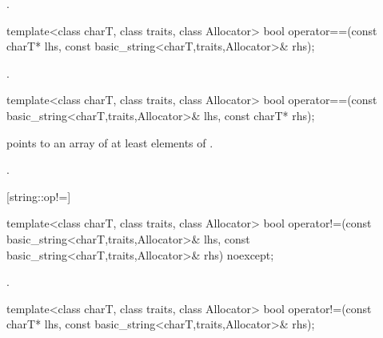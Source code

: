 \begin{itemdescr}
\pnum
\returns
{}.
\end{itemdescr}

%
%
\begin{itemdecl}
template<class charT, class traits, class Allocator>
  bool operator==(const charT* lhs,
                  const basic_string<charT,traits,Allocator>& rhs);
\end{itemdecl}

\begin{itemdescr}
\pnum
\returns
{}.
\end{itemdescr}

%
%
\begin{itemdecl}
template<class charT, class traits, class Allocator>
  bool operator==(const basic_string<charT,traits,Allocator>& lhs,
                  const charT* rhs);
\end{itemdecl}

\begin{itemdescr}
\pnum
\requires {} points to an array of at least 
elements of .

\pnum
\returns
{}.
\end{itemdescr}

%
[string::op!=]{}

%
%
\begin{itemdecl}
template<class charT, class traits, class Allocator>
  bool operator!=(const basic_string<charT,traits,Allocator>& lhs,
                  const basic_string<charT,traits,Allocator>& rhs) noexcept;
\end{itemdecl}

\begin{itemdescr}
\pnum
\returns
{}.
\end{itemdescr}

%
%
\begin{itemdecl}
template<class charT, class traits, class Allocator>
  bool operator!=(const charT* lhs,
                  const basic_string<charT,traits,Allocator>& rhs);
\end{itemdecl}

